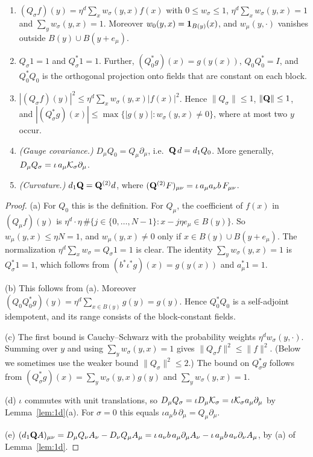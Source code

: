\begin{lemma}\label{lem:avg}
\begin{enumerate}[label=(\alph*)]
\item $(Q_\sigma f)(y)=\eta^d\sum_xw_\sigma(y,x)f(x)$ with $0\le w_\sigma\le1$, $\eta^d\sum_xw_\sigma(y,x)=1$ and $\sum_yw_\sigma(y,x)=1$. Moreover $w_0(y,x)=\mathbf 1_{B(y)}(x)$, and $w_\mu(y,\cdot)$ vanishes outside $B(y)\cup B(y+e_\mu)$.
\item $Q_\sigma1=1$ and $Q_\sigma^*1=1$. Further, $(Q_0^*g)(x)=g(y(x))$, $Q_0Q_0^*=I$, and $Q_0^*Q_0$ is the orthogonal projection onto fields that are constant on each block.
\item $|(Q_\sigma f)(y)|^2\le\eta^d\sum_xw_\sigma(y,x)|f(x)|^2$. Hence $\|Q_\sigma\|\le1$, $\|\mathbf Q\|\le1$, and $|(Q_\sigma^* g)(x)|\le\max\{|g(y)|:w_\sigma(y,x)\neq0\}$, where at most two $y$ occur.
\item \emph{(Gauge covariance.)} $D_\mu Q_0=Q_\mu\partial_\mu$, i.e.\ $\mathbf Q\,d=d_1 Q_0$. More generally, $D_\mu Q_\sigma=\iota\,a_\mu\mathcal K_\sigma\partial_\mu$.
\item \emph{(Curvature.)} $d_1\mathbf Q=\mathbf Q^{(2)}d$, where $(\mathbf Q^{(2)}F)_{\mu\nu}=\iota\,a_\mu a_\nu b\,F_{\mu\nu}$.
\end{enumerate}
\end{lemma}

\begin{proof}
(a) For $Q_0$ this is the definition. For $Q_\mu$, the coefficient of $f(x)$ in $(Q_\mu f)(y)$ is $\eta^{d}\cdot\eta\,\#\{j\in\{0,\dots,N-1\}:x-j\eta e_\mu\in B(y)\}$. So $w_\mu(y,x)\le\eta N=1$, and $w_\mu(y,x)\neq0$ only if $x\in B(y)\cup B(y+e_\mu)$. The normalization $\eta^d\sum_xw_\sigma=Q_\sigma1=1$ is clear. The identity $\sum_yw_\sigma(y,x)=1$ is $Q_\sigma^*1=1$, which follows from $(b^*\iota^*g)(x)=g(y(x))$ and $a_\mu^*1=1$.

(b) This follows from (a). Moreover $(Q_0Q_0^*g)(y)=\eta^d\sum_{x\in B(y)}g(y)=g(y)$. Hence $Q_0^*Q_0$ is a self-adjoint idempotent, and its range consists of the block-constant fields.

(c) The first bound is Cauchy--Schwarz with the probability weights $\eta^dw_\sigma(y,\cdot)$. Summing over $y$ and using $\sum_yw_\sigma(y,x)=1$ gives $\|Q_\sigma f\|^2\le\|f\|^2$. (Below we sometimes use the weaker bound $\|Q_\sigma\|^2\le2$.) The bound on $Q_\sigma^*g$ follows from $(Q_\sigma^*g)(x)=\sum_yw_\sigma(y,x)g(y)$ and $\sum_yw_\sigma(y,x)=1$.

(d) $\iota$ commutes with unit translations, so $D_\mu Q_\sigma=\iota D_\mu\mathcal K_\sigma=\iota\mathcal K_\sigma a_\mu\partial_\mu$ by Lemma~\ref{lem:1d}(a). For $\sigma=0$ this equals $\iota a_\mu b\,\partial_\mu=Q_\mu\partial_\mu$.

(e) $(d_1\mathbf Q A)_{\mu\nu}=D_\mu Q_\nu A_\nu-D_\nu Q_\mu A_\mu=\iota\,a_\nu b\,a_\mu\partial_\mu A_\nu-\iota\,a_\mu b\,a_\nu\partial_\nu A_\mu$, by (a) of Lemma~\ref{lem:1d}.
\end{proof}

